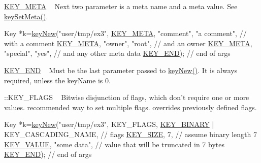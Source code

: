 \begin{DoxyItemize}
\item \hyperlink{group__key_gga91fb3178848bd682000958089abbaf40a040582834bb2d90049947d7ef74e87e2}{K\+E\+Y\+\_\+\+M\+E\+T\+A} ~\newline
 Next two parameter is a meta name and a meta value. See \hyperlink{group__keymeta_gae1f15546b234ffb6007d8a31178652b9}{key\+Set\+Meta()}. 
\begin{DoxyCodeInclude}
Key *k=\hyperlink{group__key_gad23c65b44bf48d773759e1f9a4d43b89}{keyNew}(\textcolor{stringliteral}{"user/tmp/ex3"},
        \hyperlink{group__key_gga91fb3178848bd682000958089abbaf40a040582834bb2d90049947d7ef74e87e2}{KEY\_META}, \textcolor{stringliteral}{"comment"}, \textcolor{stringliteral}{"a comment"},  \textcolor{comment}{// with a comment}
        \hyperlink{group__key_gga91fb3178848bd682000958089abbaf40a040582834bb2d90049947d7ef74e87e2}{KEY\_META}, \textcolor{stringliteral}{"owner"}, \textcolor{stringliteral}{"root"},         \textcolor{comment}{// and an owner}
        \hyperlink{group__key_gga91fb3178848bd682000958089abbaf40a040582834bb2d90049947d7ef74e87e2}{KEY\_META}, \textcolor{stringliteral}{"special"}, \textcolor{stringliteral}{"yes"},        \textcolor{comment}{// and any other meta data}
        \hyperlink{group__key_gga91fb3178848bd682000958089abbaf40aa8adb6fcb92dec58fb19410eacfdd403}{KEY\_END});                  \textcolor{comment}{// end of args}
\end{DoxyCodeInclude}

\item \hyperlink{group__key_gga91fb3178848bd682000958089abbaf40aa8adb6fcb92dec58fb19410eacfdd403}{K\+E\+Y\+\_\+\+E\+N\+D} ~\newline
 Must be the last parameter passed to \hyperlink{group__key_gad23c65b44bf48d773759e1f9a4d43b89}{key\+New()}. It is always required, unless the {\ttfamily key\+Name} is 0.
\item \+::\+K\+E\+Y\+\_\+\+F\+L\+A\+G\+S ~\newline
 Bitwise disjunction of flags, which don't require one or more values. recommended way to set multiple flags. overrides previously defined flags. 
\begin{DoxyCodeInclude}
Key *k=\hyperlink{group__key_gad23c65b44bf48d773759e1f9a4d43b89}{keyNew}(\textcolor{stringliteral}{"user/tmp/ex3"},
        KEY\_FLAGS, \hyperlink{group__key_gga91fb3178848bd682000958089abbaf40a1ca18d4e094ae7487d35ecedda2235ff}{KEY\_BINARY} | KEY\_CASCADING\_NAME, \textcolor{comment}{// flags}
        \hyperlink{group__key_gga91fb3178848bd682000958089abbaf40a6d531b5c41445d19d0452eebdccbfa01}{KEY\_SIZE}, 7,                    \textcolor{comment}{// assume binary length 7}
        \hyperlink{group__key_gga91fb3178848bd682000958089abbaf40ac66e4a49d09212b79f5754ca6db5bd2e}{KEY\_VALUE}, \textcolor{stringliteral}{"some data"},                \textcolor{comment}{// value that will be truncated in 7 bytes}
        \hyperlink{group__key_gga91fb3178848bd682000958089abbaf40aa8adb6fcb92dec58fb19410eacfdd403}{KEY\_END});                        \textcolor{comment}{// end of args}
\end{DoxyCodeInclude}


\end{DoxyItemize}
